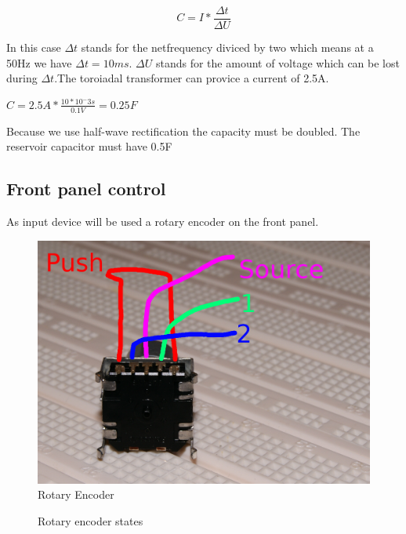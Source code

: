 \begin{equation}
	C=I*\frac{\Delta t}{\Delta U}
	\label{reservoidCapacitor}
\end{equation} 

In this case $\Delta t$ stands for the netfrequency diviced by two which means at a 50Hz we have $\Delta t = 10ms$. $\Delta U$ stands for the amount of voltage which can be lost during $\Delta t$.The toroiadal transformer can provice a current of 2.5A. 
\begin{center}
	$C=2.5A * \frac{10*10^-3s}{0.1V}=0.25F$
\end{center}
Because we use half-wave rectification the capacity must be doubled. The reservoir capacitor must have 0.5F


\subsection{Front panel control}
As input device will be used a rotary encoder on the front panel.
\begin{figure}[h!]
	\begin{center}
	\includegraphics[scale=0.5]{pictures/rotation_encoder}
	\caption{Rotary Encoder}
	\end{center}
\end{figure}

\begin{figure}[h!]
\begin{center}
\caption{Rotary encoder states}
\end{center}
\end{figure}
